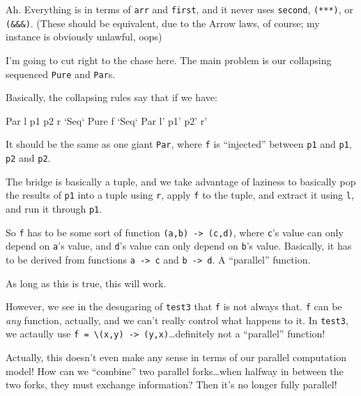 \documentclass[]{article}
\newenvironment{Shaded}{}{}
\newcommand{\DataTypeTok}[1]{\textcolor[rgb]{0.56,0.13,0.00}{{#1}}}
\newcommand{\OtherTok}[1]{\textcolor[rgb]{0.00,0.44,0.13}{{#1}}}
\newcommand{\NormalTok}[1]{{#1}}
\begin{document}
Ah. Everything is in terms of \texttt{arr} and \texttt{first}, and it
never uses \texttt{second}, \texttt{(***)}, or \texttt{(\&\&\&)}. (These
should be equivalent, due to the Arrow laws, of course; my instance is
obviously unlawful, oops)

I'm going to cut right to the chase here. The main problem is our
collapsing sequenced \texttt{Pure} and \texttt{Par}s.

Basically, the collapsing rules say that if we have:

\begin{Shaded}
\begin{Highlighting}[]
\DataTypeTok{Par} \NormalTok{l p1 p2 r }\OtherTok{`Seq`} \DataTypeTok{Pure} \NormalTok{f }\OtherTok{`Seq`} \DataTypeTok{Par} \NormalTok{l' p1' p2' r'}
\end{Highlighting}
\end{Shaded}

It should be the same as one giant \texttt{Par}, where \texttt{f} is
``injected'' between \texttt{p1} and \texttt{p1\textquotesingle{}},
\texttt{p2} and \texttt{p2\textquotesingle{}}.

The bridge is basically a tuple, and we take advantage of laziness to
basically pop the results of \texttt{p1} into a tuple using \texttt{r},
apply \texttt{f} to the tuple, and extract it using \texttt{l}, and run
it through \texttt{p1\textquotesingle{}}.

So \texttt{f} has to be some sort of function
\texttt{(a,b)\ -\textgreater{}\ (c,d)}, where \texttt{c}'s value can
only depend on \texttt{a}'s value, and \texttt{d}'s value can only
depend on \texttt{b}'s value. Basically, it has to be derived from
functions \texttt{a\ -\textgreater{}\ c} and
\texttt{b\ -\textgreater{}\ d}. A ``parallel'' function.

As long as this is true, this will work.

However, we see in the desugaring of \texttt{test3} that \texttt{f} is
not always that. \texttt{f} can be \emph{any} function, actually, and we
can't really control what happens to it. In \texttt{test3}, we actaully
use
\texttt{f\ =\ \textbackslash{}(x,y)\ -\textgreater{}\ (y,x)}\ldots{}definitely
not a ``parallel'' function!

Actually, this doesn't even make any sense in terms of our parallel
computation model! How can we ``combine'' two parallel forks\ldots{}when
halfway in between the two forks, they must exchange information? Then
it's no longer fully parallel!
\end{document}
